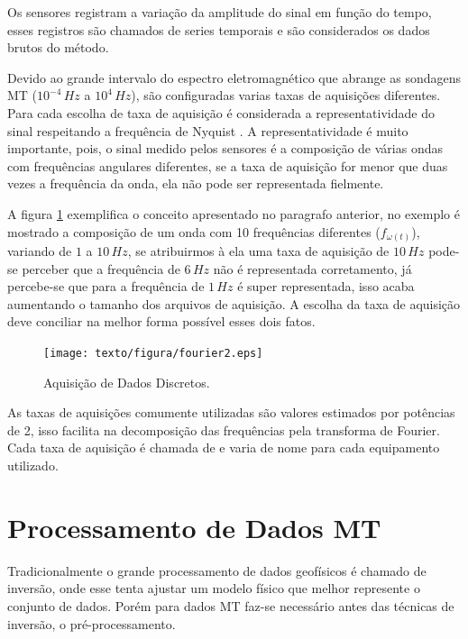         Os sensores registram a variação da amplitude do sinal em função do tempo, esses registros são chamados de series temporais e são considerados os dados brutos do método. 
        
        Devido ao grande intervalo do espectro eletromagnético que abrange as sondagens MT ($10^{-4}\, Hz$ a $10^{4}\, Hz$), são configuradas varias taxas de aquisições diferentes. Para cada escolha de taxa de aquisição é considerada a representatividade do sinal respeitando a frequência de Nyquist \cite{nyquist28}. A representatividade é muito importante, pois, o sinal medido pelos sensores é a composição de várias ondas com frequências angulares diferentes, se a taxa de aquisição for menor que duas vezes a frequência da onda, ela não pode ser representada fielmente.  
        
        A figura \ref{fig-aquisicao} exemplifica o conceito apresentado no paragrafo anterior, no exemplo é mostrado a composição de um onda com 10 frequências diferentes ($f_{\omega(t)}$), variando de $1$ a $10\, Hz$, se atribuirmos à ela uma taxa de aquisição de $10\,Hz$ pode-se perceber que a frequência de $6\,Hz$ não é representada corretamento, já percebe-se que para a frequência de $1\,Hz$ é super representada, isso acaba aumentando o tamanho dos arquivos de aquisição. A escolha da taxa de aquisição deve conciliar na melhor forma possível esses dois fatos.
        
        \begin{figure}[H]
            \caption{Aquisição de Dados Discretos.}
                \begin{center}
                    \texttt{[image: texto/figura/fourier2.eps]}
                \end{center}
            \label{fig-aquisicao}
        \end{figure}
    
        As taxas de aquisições comumente utilizadas são valores estimados por potências de 2, isso facilita na decomposição das frequências pela transforma de Fourier. Cada taxa de aquisição é chamada de  e varia de nome para cada equipamento utilizado. 
    
    \section{Processamento de Dados MT}
        Tradicionalmente o grande processamento de dados geofísicos é chamado de inversão, onde esse tenta ajustar um modelo físico que melhor represente o conjunto de dados. Porém para dados MT faz-se necessário antes das técnicas de inversão, o pré-processamento.
        

